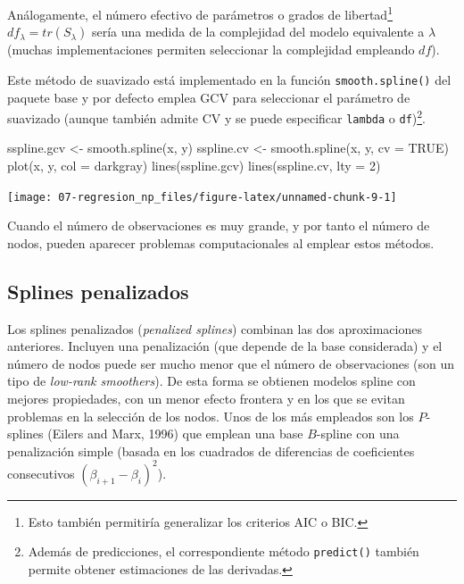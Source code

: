 \documentclass[
]{book}
\newenvironment{Shaded}{\begin{snugshade}}{\end{snugshade}}
\newcommand{\AttributeTok}[1]{\textcolor[rgb]{0.77,0.63,0.00}{#1}}
\newcommand{\ConstantTok}[1]{\textcolor[rgb]{0.00,0.00,0.00}{#1}}
\newcommand{\DecValTok}[1]{\textcolor[rgb]{0.00,0.00,0.81}{#1}}
\newcommand{\FunctionTok}[1]{\textcolor[rgb]{0.00,0.00,0.00}{#1}}
\newcommand{\NormalTok}[1]{#1}
\newcommand{\OtherTok}[1]{\textcolor[rgb]{0.56,0.35,0.01}{#1}}
\newcommand{\StringTok}[1]{\textcolor[rgb]{0.31,0.60,0.02}{#1}}
\theoremstyle{break}
\theoremstyle{definition}
\theoremstyle{definition}
\theoremstyle{definition}
\theoremstyle{definition}
\theoremstyle{remark}
\begin{document}
Análogamente, el número efectivo de parámetros o grados de libertad\footnote{Esto también permitiría generalizar los criterios AIC o BIC.} \(df_{\lambda}=tr(S_{\lambda})\) sería una medida de la complejidad del modelo equivalente a \(\lambda\) (muchas implementaciones permiten seleccionar la complejidad empleando \(df\)).

Este método de suavizado está implementado en la función \texttt{smooth.spline()} del paquete base y por defecto emplea GCV para seleccionar el parámetro de suavizado (aunque también admite CV y se puede especificar \texttt{lambda} o \texttt{df})\footnote{Además de predicciones, el correspondiente método \texttt{predict()} también permite obtener estimaciones de las derivadas.}.

\begin{Shaded}
\begin{Highlighting}[]
\NormalTok{sspline.gcv }\OtherTok{\textless{}{-}} \FunctionTok{smooth.spline}\NormalTok{(x, y)}
\NormalTok{sspline.cv }\OtherTok{\textless{}{-}} \FunctionTok{smooth.spline}\NormalTok{(x, y, }\AttributeTok{cv =} \ConstantTok{TRUE}\NormalTok{)}
\FunctionTok{plot}\NormalTok{(x, y, }\AttributeTok{col =} \StringTok{\textquotesingle{}darkgray\textquotesingle{}}\NormalTok{)}
\FunctionTok{lines}\NormalTok{(sspline.gcv)}
\FunctionTok{lines}\NormalTok{(sspline.cv, }\AttributeTok{lty =} \DecValTok{2}\NormalTok{)}
\end{Highlighting}
\end{Shaded}

\begin{center}\texttt{[image: 07-regresion\_np\_files/figure-latex/unnamed-chunk-9-1]} \end{center}

Cuando el número de observaciones es muy grande, y por tanto el número de nodos, pueden aparecer problemas computacionales al emplear estos métodos.

\hypertarget{splines-penalizados}{%
\subsection{Splines penalizados}\label{splines-penalizados}}

Los splines penalizados (\emph{penalized splines}) combinan las dos aproximaciones anteriores.
Incluyen una penalización (que depende de la base considerada) y el número de nodos puede ser mucho menor que el número de observaciones (son un tipo de \emph{low-rank smoothers}). De esta forma se obtienen modelos spline con mejores propiedades, con un menor efecto frontera y en los que se evitan problemas en la selección de los nodos.
Unos de los más empleados son los \(P\)-splines (Eilers and Marx, 1996) que emplean una base \(B\)-spline con una penalización simple (basada en los cuadrados de diferencias de coeficientes consecutivos \((\beta_{i+1} - \beta_i)^2\)).
\end{document}
